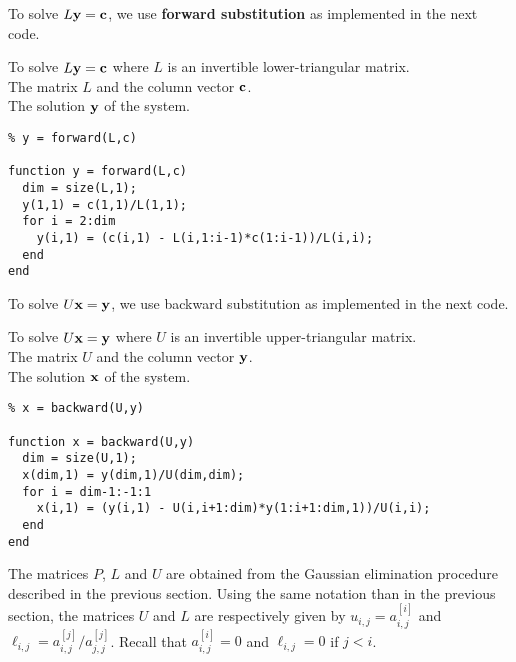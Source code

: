 To solve $L\mathbf{y}=\mathbf{c}$, we use
{\bfseries forward substitution} as
implemented in the next code.

\begin{code}
To solve $L\mathbf{y}=\mathbf{c}$ where $L$ is an invertible
lower-triangular matrix.\\
 The matrix $L$ and the column vector $\mathbf{c}$.\\
 The solution $\mathbf{y}$ of the system.
\small
\begin{verbatim}
% y = forward(L,c)

function y = forward(L,c)
  dim = size(L,1);
  y(1,1) = c(1,1)/L(1,1);
  for i = 2:dim
    y(i,1) = (c(i,1) - L(i,1:i-1)*c(1:i-1))/L(i,i);
  end
end
\end{verbatim}
\label{codeforward}
\end{code}

To solve $U\mathbf{x}=\mathbf{y}$, we use backward substitution as
implemented in the next code.

\begin{code}
To solve $U\mathbf{x}=\mathbf{y}$ where $U$ is an invertible
upper-triangular matrix.\\
 The matrix $U$ and the column vector $\mathbf{y}$.\\
 The solution $\mathbf{x}$ of the system.
\small
\begin{verbatim}
% x = backward(U,y)

function x = backward(U,y)
  dim = size(U,1);
  x(dim,1) = y(dim,1)/U(dim,dim);
  for i = dim-1:-1:1
    x(i,1) = (y(i,1) - U(i,i+1:dim)*y(1:i+1:dim,1))/U(i,i);
  end
end
\end{verbatim}
\label{codebackward}
\end{code}

The matrices $P$, $L$ and $U$ are obtained from the Gaussian
elimination procedure described in the previous section.  Using the
same notation than in the previous section, the matrices $U$ and $L$ 
are respectively given by $u_{i,j}= a^{[i]}_{i,j}$ and
$\ell_{i,j} = a^{[j]}_{i,j}/a^{[j]}_{j,j}$.  Recall that
$a^{[i]}_{i,j} = 0$ and $\ell_{i,j} = 0$ if $j<i$.

